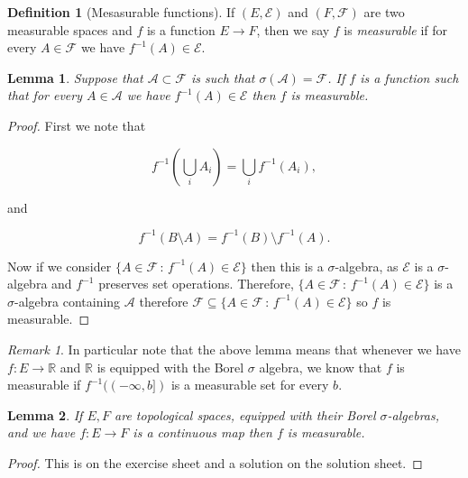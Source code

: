 \documentclass[
]{book}
\newtheorem{lemma}{Lemma}[chapter]
\theoremstyle{definition}
\newtheorem{definition}{Definition}[chapter]
\theoremstyle{definition}
\theoremstyle{definition}
\theoremstyle{definition}
\theoremstyle{remark}
\newtheorem*{remark}{Remark}
\begin{document}
\begin{definition}[Mesasurable functions]
If \((E, \mathcal{E})\) and \((F, \mathcal{F})\) are two measurable spaces and \(f\) is a function \(E \rightarrow F\), then we say \(f\) is \emph{measurable} if for every \(A \in \mathcal{F}\) we have \(f^{-1}(A) \in \mathcal{E}\).
\end{definition}

\begin{lemma}
Suppose that \(\mathcal{A} \subset \mathcal{F}\) is such that \(\sigma(\mathcal{A})= \mathcal{F}\). If \(f\) is a function such that for every \(A \in \mathcal{A}\) we have \(f^{-1}(A) \in \mathcal{E}\) then \(f\) is measurable.
\end{lemma}

\begin{proof}
First we note that

\[ f^{-1}\left( \bigcup_i A_i \right) = \bigcup_i f^{-1}(A_i), \]

and

\[ f^{-1}(B \setminus A) = f^{-1}(B) \setminus f^{-1}(A). \]

Now if we consider \(\{ A \in \mathcal{F} \, :\, f^{-1}(A) \in \mathcal{E}\}\) then this is a \(\sigma\)-algebra, as \(\mathcal{E}\) is a \(\sigma\)-algebra and \(f^{-1}\) preserves set operations. Therefore, \(\{ A \in \mathcal{F} \, :\, f^{-1}(A) \in \mathcal{E}\}\) is a \(\sigma\)-algebra containing \(\mathcal{A}\) therefore \(\mathcal{F} \subseteq \{ A \in \mathcal{F} \, :\, f^{-1}(A) \in \mathcal{E}\}\) so \(f\) is measurable.
\end{proof}

\begin{remark}
In particular note that the above lemma means that whenever we have \(f: E \rightarrow \mathbb{R}\) and \(\mathbb{R}\) is equipped with the Borel \(\sigma\) algebra, we know that \(f\) is measurable if \(f^{-1}((-\infty, b])\) is a measurable set for every \(b\).
\end{remark}

\begin{lemma}
If \(E, F\) are topological spaces, equipped with their Borel \(\sigma\)-algebras, and we have \(f:E \rightarrow F\) is a continuous map then \(f\) is measurable.
\end{lemma}

\begin{proof}
This is on the exercise sheet and a solution on the solution sheet.
\end{proof}
\end{document}
